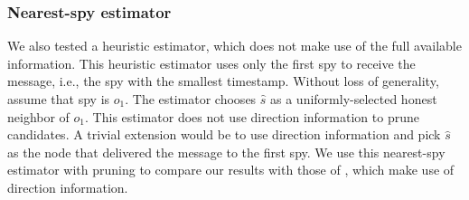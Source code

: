 \subsubsection{Nearest-spy estimator}
We also tested a heuristic estimator, which does not make use of the full available information. This heuristic estimator uses only the first spy to receive the message, i.e., the spy with the smallest timestamp. Without loss of generality, assume that spy is $o_1$. The estimator chooses $\hat s$ as a uniformly-selected honest neighbor of $o_1$. This estimator does not use direction information to prune candidates. A trivial extension would be to use direction information and pick $\hat s$ as the node that delivered the message to the first spy. We use this nearest-spy estimator with pruning to compare our results with those of \cite{pinto}, which make use of direction information. 